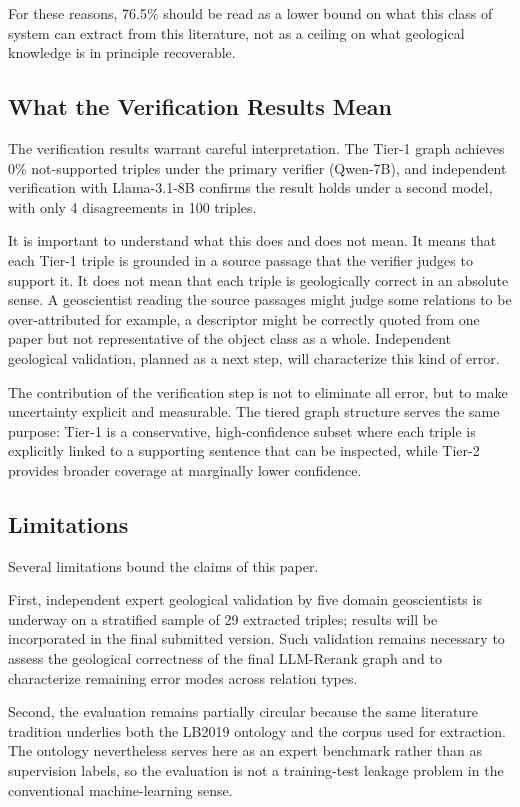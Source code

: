 \documentclass[10pt]{article}
\begin{document}
For these reasons, 76.5\% should be read as a lower bound on
what this class of system can extract from this literature, not
as a ceiling on what geological knowledge is in principle
recoverable.

\subsection{What the Verification Results Mean}

The verification results warrant careful interpretation.
The Tier-1 graph achieves 0\% not-supported triples under the
primary verifier (Qwen-7B), and independent verification with
Llama-3.1-8B confirms the result holds under a second model,
with only 4 disagreements in 100 triples.

It is important to understand what this does and does not mean.
It means that each Tier-1 triple is grounded in a source passage
that the verifier judges to support it.
It does not mean that each triple is geologically correct in an
absolute sense.
A geoscientist reading the source passages might judge some
relations to be over-attributed for example, a descriptor
might be correctly quoted from one paper but not representative
of the object class as a whole.
Independent geological validation, planned as a next step, will
characterize this kind of error.

The contribution of the verification step is not to eliminate
all error, but to make uncertainty explicit and measurable.
The tiered graph structure serves the same purpose: Tier-1 is
a conservative, high-confidence subset where each triple is
explicitly linked to a supporting sentence that can be inspected,
while Tier-2 provides broader coverage at marginally lower
confidence.


\subsection{Limitations}
\label{sec:limitations}

Several limitations bound the claims of this paper.

First, independent expert geological validation by five
domain geoscientists is underway on a stratified sample
of 29 extracted triples; results will be incorporated
in the final submitted version.
Such validation remains necessary to assess the geological correctness
of the final LLM-Rerank graph and to characterize remaining error modes
across relation types.

Second, the evaluation remains partially circular because the same
literature tradition underlies both the LB2019 ontology and the corpus
used for extraction.
The ontology nevertheless serves here as an expert benchmark rather
than as supervision labels, so the evaluation is not a training-test
leakage problem in the conventional machine-learning sense.
\end{document}
